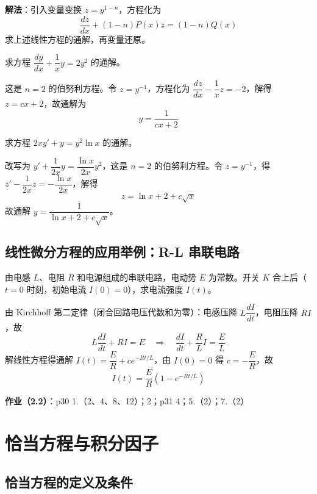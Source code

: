 \textbf{解法}：引入变量变换 $z = y^{1-n}$，方程化为
$$\frac{dz}{dx} + (1-n)P(x)z = (1-n)Q(x)$$
求上述线性方程的通解，再变量还原。

\begin{example}
求方程 $\dfrac{dy}{dx} + \dfrac{1}{x}y = 2y^2$ 的通解。
\end{example}

\begin{solution}
这是 $n=2$ 的伯努利方程。令 $z = y^{-1}$，方程化为 $\dfrac{dz}{dx} - \dfrac{1}{x}z = -2$，解得 $z = cx + 2$，故通解为
$$y = \frac{1}{cx + 2}$$
\end{solution}

\begin{example}
求方程 $2xy' + y = y^2\ln x$ 的通解。
\end{example}

\begin{solution}
改写为 $y' + \dfrac{1}{2x}y = \dfrac{\ln x}{2x}y^2$，这是 $n=2$ 的伯努利方程。令 $z = y^{-1}$，得 $z' - \dfrac{1}{2x}z = -\dfrac{\ln x}{2x}$，解得
$$z = \ln x + 2 + c\sqrt{x}$$
故通解 $y = \dfrac{1}{\ln x + 2 + c\sqrt{x}}$。
\end{solution}

\subsection{线性微分方程的应用举例：R-L 串联电路}

由电感 $L$、电阻 $R$ 和电源组成的串联电路，电动势 $E$ 为常数。开关 $K$ 合上后（$t=0$ 时刻，初始电流 $I(0) = 0$），求电流强度 $I(t)$。

由 Kirchhoff 第二定律（闭合回路电压代数和为零）：电感压降 $L\dfrac{dI}{dt}$，电阻压降 $RI$，故
$$L\frac{dI}{dt} + RI = E \quad \Rightarrow \quad \frac{dI}{dt} + \frac{R}{L}I = \frac{E}{L}$$
解线性方程得通解 $I(t) = \dfrac{E}{R} + ce^{-Rt/L}$，由 $I(0) = 0$ 得 $c = -\dfrac{E}{R}$，故
$$I(t) = \frac{E}{R}\left(1 - e^{-Rt/L}\right)$$

\textbf{作业（2.2）}：p30 1.（2、4、8、12）；2；p31 4；5.（2）；7.（2）

\section{恰当方程与积分因子}

\subsection{恰当方程的定义及条件}

